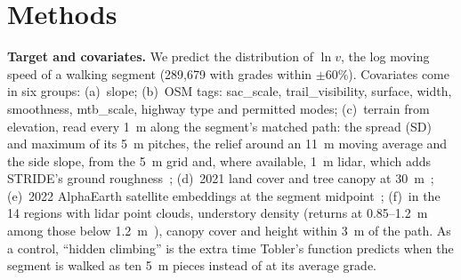 \section{Methods}
\label{sec:methods}


\textbf{Target and covariates.} We predict the distribution of $\ln v$,
the log moving speed of a walking segment (289,679 with grades within
$\pm$60\%). Covariates come in six groups:
(a)~slope; (b)~OSM tags: sac\_scale, trail\_visibility, surface, width,
smoothness, mtb\_scale, highway type and permitted modes; (c)~terrain from
elevation, read every 1~m along the segment's matched path: the spread (SD)
and maximum of its 5~m pitches, the relief around an 11~m moving average
and the side slope, from the 5~m grid and, where available, 1~m lidar,
which adds STRIDE's ground roughness~\cite{campbell2024stride}; (d)~2021
land cover and tree canopy at 30~m~\cite{dewitz2023nlcd}; (e)~2022
AlphaEarth satellite embeddings at the segment
midpoint~\cite{brown2025alphaearth,alphaearth2025}; (f)~in the 14 regions
with lidar point clouds, understory density (returns at 0.85--1.2~m among
those below 1.2~m~\cite{campbell2018understory}), canopy cover and height
within 3~m of the path. As a control,
``hidden climbing'' is the extra time Tobler's function predicts when the
segment is walked as ten 5~m pieces instead of at its average grade.

